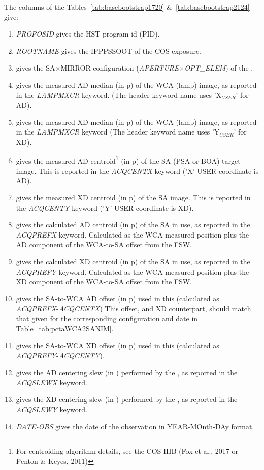 The columns of the Tables~\ref{tab:basebootstrap1720} \&~\ref{tab:basebootstrap2124} give:
\footnotesize
\begin{enumerate}
\item \textit{PROPOSID} gives the HST program id (PID).
\item \textit{ROOTNAME} gives the IPPPSSOOT of the COS exposure.
\item gives the SA$\times$MIRROR configuration (\textit{APERTURE}$\times$\textit{OPT\_ELEM}) of the .
\item gives the measured AD median (in p) of the WCA (lamp) image, as reported in the  \textit{LAMPMXCR} keyword.
(The header keyword name uses 'X$_{USER}$' for AD).
\item gives the measured XD median (in p) of the WCA (lamp) image, as reported in the \textit{LAMPMXCR} keyword (The header keyword name uses 'Y$_{USER}$' for XD).
\item gives the measured AD centroid\footnote{For  centroiding algorithm details, see the COS IHB (Fox et al., 2017 or Penton \& Keyes, 2011)} (in p) of the SA (PSA or BOA) target image. This is reported in the \textit{ACQCENTX} keyword ('X' USER coordinate is AD).
\item gives the measured XD centroid (in p) of the SA image. This is reported in the \textit{ACQCENTY} keyword ('Y' USER coordinate is XD).
\item gives the calculated AD centroid (in p) of the SA in use, as reported in the \textit{ACQPREFX} keyword. Calculated as the WCA measured position plus the AD component of the WCA-to-SA offset from the FSW.
\item gives the calculated XD centroid (in p) of the SA in use, as reported in the \textit{ACQPREFY} keyword. Calculated as the WCA measured position plus the XD component of the WCA-to-SA offset from the FSW.
\item gives the SA-to-WCA AD offset (in p) used in this  (calculated as \textit{ACQPREFX}-\textit{ACQCENTX}) This offset, and XD counterpart, should match that given for the corresponding configuration and date in Table~\ref{tab:pctaWCA2SANIM}.
\item gives the SA-to-WCA XD offset (in p) used in this  (calculated as \textit{ACQPREFY}-\textit{ACQCENTY}).
\item gives the AD centering slew (in \arcsec) performed by the , as reported in the \textit{ACQSLEWX} keyword.
\item gives the XD centering slew (in \arcsec) performed by the , as reported in the \textit{ACQSLEWY} keyword.
\item \textit{DATE-OBS} gives the date of the observation in YEAR-MOnth-DAy format.
\end{enumerate}
\normalsize

